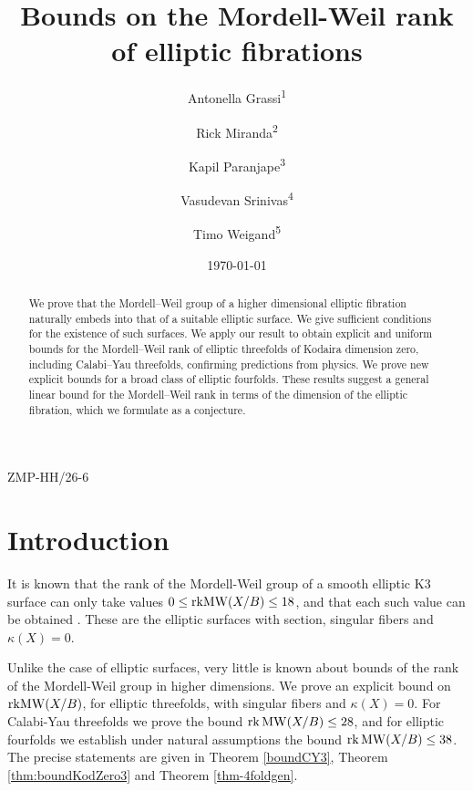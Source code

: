 \documentclass[11pt]{amsart}
\title[Bounds on Mordell-Weil ranks]{Bounds on the Mordell-Weil rank of elliptic  fibrations}
\author[Grassi]{Antonella Grassi\textsuperscript{1}}
\author[Miranda]{Rick Miranda\textsuperscript{2}}
\author[Paranjape]{Kapil Paranjape\textsuperscript{3}}
\author[Srinivas]{Vasudevan Srinivas\textsuperscript{4}}
\author[Weigand]{Timo Weigand\textsuperscript{5}}
\date{\today}
\theoremstyle{definition}
\theoremstyle{definition}
\theoremstyle{remark}
\theoremstyle{remark}
\theoremstyle{definition}
\theoremstyle{conjecture}
\newcommand{\MW}{\mathrm{MW}}
\begin{document}
\begin{flushright}
 \small{ZMP-HH/26-6} \vspace{4mm}
\end{flushright}



\begin{abstract} We prove that the Mordell{--}Weil group of a higher dimensional elliptic fibration naturally embeds into that of a suitable elliptic surface. We give sufficient conditions for the existence of such  surfaces. \color{black} We apply our result to obtain explicit and  uniform bounds for the Mordell{--}Weil rank of elliptic threefolds of Kodaira dimension zero, including Calabi{--}Yau threefolds, confirming predictions from physics. We prove new explicit bounds for a broad class of elliptic fourfolds. These results suggest a general linear bound for the Mordell{--}Weil rank in terms of the dimension of the elliptic fibration, which we formulate as a conjecture.

\end{abstract}


\maketitle

\section{Introduction}





  It is known that the rank of the Mordell-Weil group  of a  smooth  elliptic
  K3 surface can only take values 
  $0 \leq {\rm rk}\MW(X/B)\leq 18$,  and that each such value can be obtained \cite{Cox1982, Kuwata2000MW,Kloosterman2007}. These are  the elliptic surfaces with section, singular fibers and $\kappa(X)=0$.

Unlike the case of elliptic surfaces, very little is known  about bounds of the rank of the Mordell-Weil group in higher dimensions. 
We prove an explicit bound on $ {\rm rk}\MW(X/B)$, for elliptic threefolds, with singular fibers and   $\kappa(X) = 0$. 
  For  Calabi-Yau threefolds we prove the  bound 
  $\mathrm{rk}\,{\rm MW} (X/B) \le 28$, and for elliptic fourfolds we establish  under natural assumptions the %
  bound $\mathrm{rk}\,{\rm MW} (X/B) \le 38$.  The precise statements %
 are given in   Theorem \ref{boundCY3}, Theorem \ref{thm:boundKodZero3} and Theorem \ref{thm-4foldgen}.
 
\end{document}
